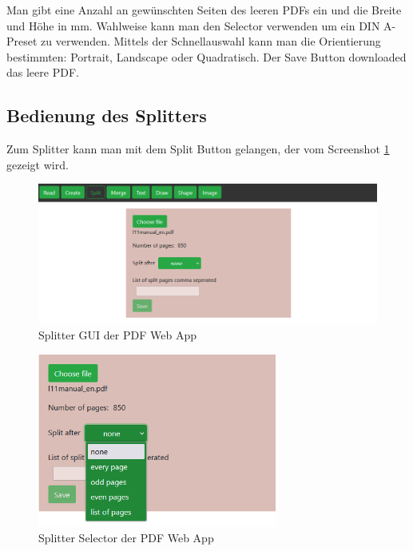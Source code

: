Man gibt eine Anzahl an gewünschten Seiten des leeren PDFs ein und die Breite und Höhe in mm. Wahlweise kann man den Selector verwenden um ein DIN A-Preset zu verwenden. Mittels der Schnellauswahl kann man die Orientierung bestimmten: Portrait, Landscape oder Quadratisch. Der Save Button downloaded das leere PDF. \\

\subsection{Bedienung des Splitters}
Zum Splitter kann man mit dem Split Button gelangen, der vom Screenshot \ref{fig:splitter} gezeigt wird.

\begin{figure}[!htbp]
	\centering
	\includegraphics[width=1\textwidth]{"images/splitter.png"}
	\caption{Splitter GUI der PDF Web App}
	\label{fig:splitter}
\end{figure}

\begin{figure}[!htbp]
	\centering
	\includegraphics[width=0.7\textwidth]{"images/splitter2.png"}
	\caption{Splitter Selector der PDF Web App}
	\label{fig:splitter2}
\end{figure}

